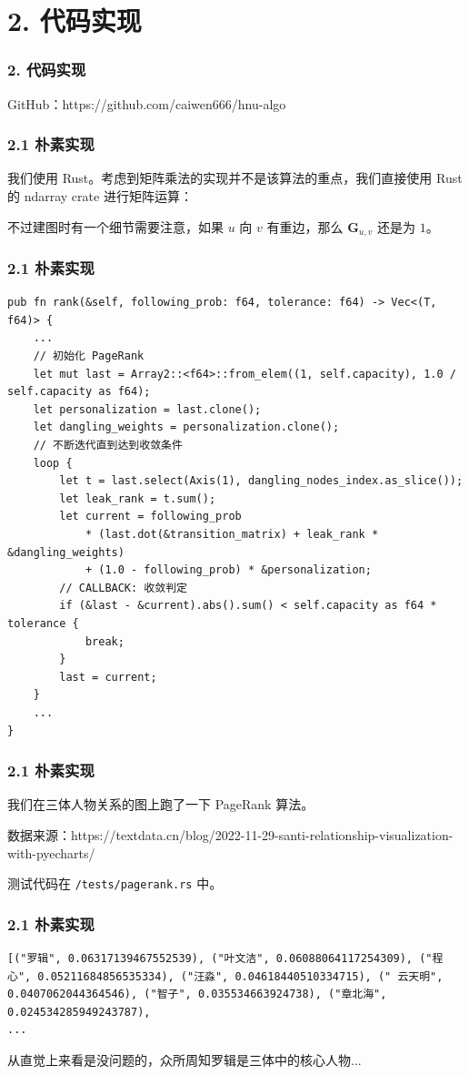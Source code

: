 \documentclass{beamer}
\begin{document}
\section{2. 代码实现}

\begin{frame}
	\frametitle{2. 代码实现}
	GitHub：https://github.com/caiwen666/hnu-algo
\end{frame}

\begin{frame}
	\frametitle{2.1 朴素实现}
	我们使用 Rust。考虑到矩阵乘法的实现并不是该算法的重点，我们直接使用 Rust 的 ndarray crate 进行矩阵运算： \pause

	不过建图时有一个细节需要注意，如果 \(u\) 向 \(v\) 有重边，那么 \(\mathbf{G}_{u,v}\) 还是为 \(1\)。
\end{frame}

\begin{frame}[fragile]
	\frametitle{2.1 朴素实现}
\begin{lstlisting}
pub fn rank(&self, following_prob: f64, tolerance: f64) -> Vec<(T, f64)> {
	...
    // 初始化 PageRank
    let mut last = Array2::<f64>::from_elem((1, self.capacity), 1.0 / self.capacity as f64);
    let personalization = last.clone();
    let dangling_weights = personalization.clone();
    // 不断迭代直到达到收敛条件
    loop {
        let t = last.select(Axis(1), dangling_nodes_index.as_slice());
        let leak_rank = t.sum();
        let current = following_prob
            * (last.dot(&transition_matrix) + leak_rank * &dangling_weights)
            + (1.0 - following_prob) * &personalization;
        // CALLBACK: 收敛判定
        if (&last - &current).abs().sum() < self.capacity as f64 * tolerance {
            break;
        }
        last = current;
    }
	...
}
\end{lstlisting}
\end{frame}

\begin{frame}
	\frametitle{2.1 朴素实现}
	我们在三体人物关系的图上跑了一下 PageRank 算法。 \pause

	数据来源：https://textdata.cn/blog/2022-11-29-santi-relationship-visualization-with-pyecharts/ \pause

	测试代码在 \texttt{/tests/pagerank.rs} 中。
\end{frame}

\begin{frame}[fragile]
	\frametitle{2.1 朴素实现}
\begin{lstlisting}
[("罗辑", 0.06317139467552539), ("叶文洁", 0.06088064117254309), ("程心", 0.05211684856535334), ("汪淼", 0.04618440510334715), (" 云天明", 0.0407062044364546), ("智子", 0.035534663924738), ("章北海", 0.024534285949243787),
...
\end{lstlisting}
	\pause

	从直觉上来看是没问题的，众所周知罗辑是三体中的核心人物... 
	
\end{frame}
\end{document}

